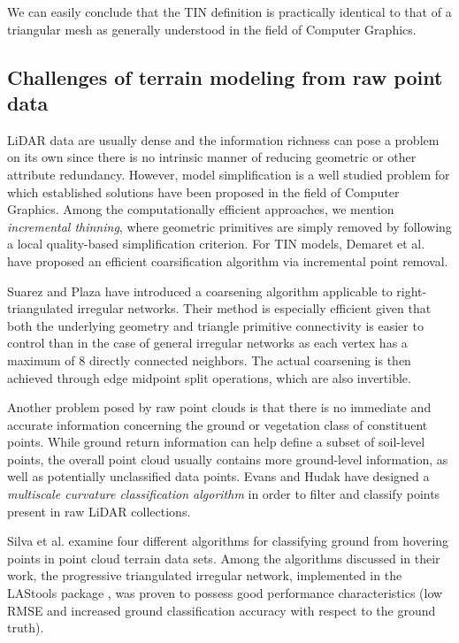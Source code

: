 \documentclass[graybox]{svmult}
\begin{document}
	We can easily conclude that the TIN definition is practically identical to that of a triangular mesh as generally understood in the field of Computer Graphics.
	
	
	\subsection{Challenges of terrain modeling from raw point data}
	LiDAR data are usually dense and the information richness can pose a problem on its own since there is no intrinsic manner of reducing geometric or other attribute redundancy.
	However, model simplification is a well studied problem for which established solutions have been proposed in the field of Computer Graphics. Among the computationally efficient
	approaches, we mention \emph{incremental thinning}, where geometric primitives are simply removed by following a local quality-based simplification criterion. For TIN models,
	Demaret et al. \cite{Demaret2005} have proposed an efficient coarsification algorithm via incremental point removal.
	
	Suarez and Plaza \cite{Suarez2009} have introduced a coarsening algorithm applicable to right-triangulated irregular networks. Their method is especially efficient
	given that both the underlying geometry and triangle primitive connectivity is easier to control than in the case of general irregular networks as each vertex has a maximum of
	8 directly connected neighbors. The actual coarsening is then achieved through edge midpoint split operations, which are also invertible.
	
	Another problem posed by raw point clouds is that there is no immediate and accurate information concerning the ground or vegetation class of constituent points.
	While ground return information can help define a subset of soil-level points, the overall point cloud usually contains more ground-level information, as well as potentially
	unclassified data points.
	Evans and Hudak \cite{Evans2007} have designed a \emph{multiscale curvature classification algorithm} in order to filter and classify points present in raw LiDAR collections.
	
	Silva et al. \cite{Silva2018} examine four different algorithms for classifying ground from hovering points in point cloud terrain data sets. Among the algorithms discussed 
	in their work, the progressive triangulated irregular network, implemented in the LAStools package \cite{Isenburg2015}, was proven to possess good performance characteristics
	(low RMSE and increased ground classification accuracy with respect to the ground truth). 
	
\end{document}
